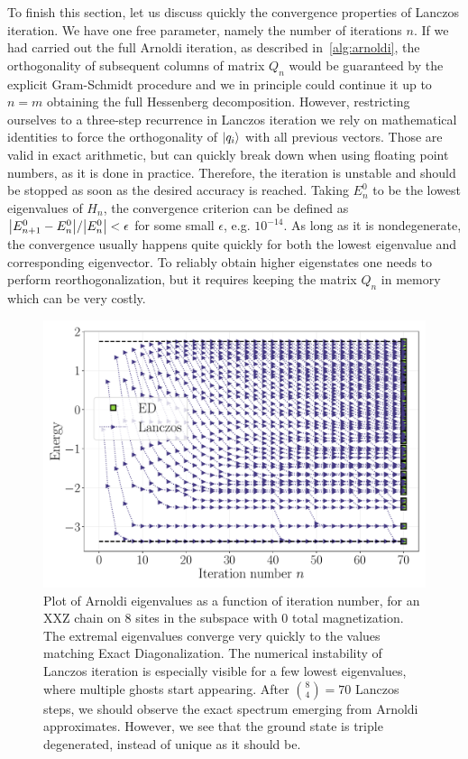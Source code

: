 To finish this section, let us discuss quickly the convergence properties of Lanczos iteration. We have one free parameter,
namely the number of iterations \(n\). If we had carried out the full Arnoldi iteration, as described in~\ref{alg:arnoldi},
the orthogonality of subsequent columns of matrix \(Q_n\) would be guaranteed by the explicit Gram-Schmidt procedure
and we in principle could continue it up to \(n = m\) obtaining the full Hessenberg decomposition. However,
restricting ourselves to a three-step recurrence in Lanczos iteration we rely on mathematical identities to
force the orthogonality of \(\ket{q_i}\) with all previous vectors. Those are valid in exact arithmetic, but can
quickly break down when using floating point numbers, as it is done in practice. Therefore, the iteration is unstable and
should be stopped as soon as the desired accuracy is reached. Taking \(E_n^0\) to be the lowest eigenvalues of
\(H_n\), the convergence criterion can be defined as \(\abs{E_{n+1}^0 - E_{n}^0}/\abs{E_n^0} < \epsilon\) for some
small \(\epsilon\), e.g. \(10^{-14}\). As long as it is nondegenerate, the convergence usually happens quite quickly for
both the lowest eigenvalue and corresponding eigenvector. To reliably obtain higher eigenstates one needs to perform
reorthogonalization, but it requires keeping the matrix \(Q_n\) in memory which can be very costly.
\begin{figure}[htbp]
	\centering
	\includegraphics[width=\linewidth]{Figures/lanczos_L_82.pdf}
	\caption{Plot of Arnoldi eigenvalues as a function of iteration number, for an XXZ chain on \(8\) sites in the
		subspace with \(0\) total magnetization. The extremal eigenvalues converge very quickly to the values matching
		Exact Diagonalization. The numerical instability of Lanczos iteration is especially visible for a few lowest
		eigenvalues, where multiple ghosts start appearing. After \(\binom{8}{4} = 70\) Lanczos steps,
		we should observe the exact spectrum emerging from Arnoldi approximates. However,
		we see that the ground state is triple degenerated, instead of unique as it should be.}
	\label{fig:ghosts}
\end{figure}
